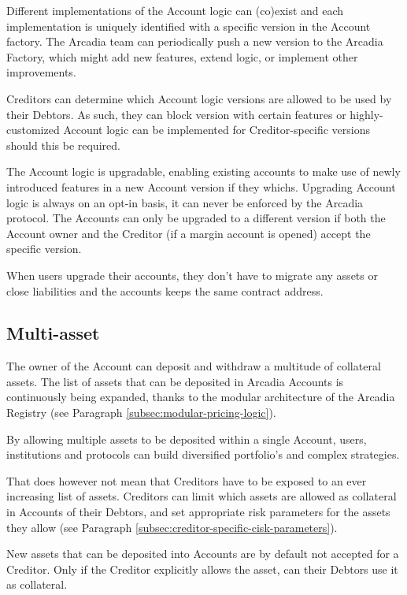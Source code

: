 \documentclass[sigconf,nonacm]{acmart}
\begin{document}
Different implementations of the Account logic can (co)exist and each implementation is uniquely identified with a specific version in the Account factory.
The Arcadia team can periodically push a new version to the Arcadia Factory, which might add new features, extend logic, or implement other improvements.

Creditors can determine which Account logic versions are allowed to be used by their Debtors.
As such, they can block version with certain features or highly-customized Account logic can be implemented for Creditor-specific versions should this be required.

The Account logic is upgradable, enabling existing accounts to make use of newly introduced features in a new Account version if they whichs.
Upgrading Account logic is always on an opt-in basis, it can never be enforced by the Arcadia protocol.
The Accounts can only be upgraded to a different version if both the Account owner and the Creditor (if a margin account is opened) accept the specific version.

When users upgrade their accounts, they don't have to migrate any assets or close liabilities and the accounts keeps the same contract address.

\subsection{Multi-asset}
\label{subsec:multi-asset}
The owner of the Account can deposit and withdraw a multitude of collateral assets.
The list of assets that can be deposited in Arcadia Accounts is continuously being expanded, thanks to the modular architecture of the Arcadia Registry (see Paragraph \ref{subsec:modular-pricing-logic}).

By allowing multiple assets to be deposited within a single Account, users, institutions and protocols can build diversified portfolio's and complex strategies.

That does however not mean that Creditors have to be exposed to an ever increasing list of assets.
Creditors can limit which assets are allowed as collateral in Accounts of their Debtors,
and set appropriate risk parameters for the assets they allow (see Paragraph \ref{subsec:creditor-specific-cisk-parameters}).

New assets that can be deposited into Accounts are by default not accepted for a Creditor.
Only if the Creditor explicitly allows the asset, can their Debtors use it as collateral.
\end{document}
